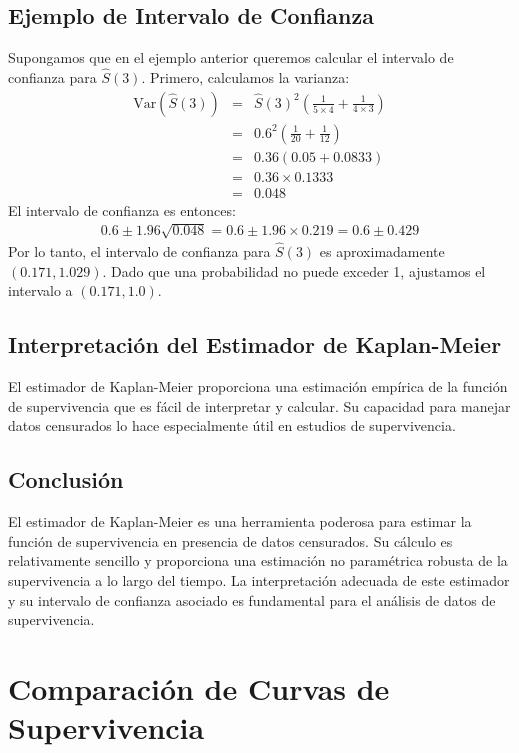 \documentclass[a4paper]{report} %
\begin{document}
\section{Ejemplo de Intervalo de Confianza}
Supongamos que en el ejemplo anterior queremos calcular el intervalo de confianza para $\hat{S}(3)$. Primero, calculamos la varianza:
\begin{eqnarray*}
\text{Var}(\hat{S}(3)) &=& \hat{S}(3)^2 \left( \frac{1}{5 \times 4} + \frac{1}{4 \times 3} \right) \\
                       &=& 0.6^2 \left( \frac{1}{20} + \frac{1}{12} \right) \\
                       &=& 0.36 \left( 0.05 + 0.0833 \right) \\
                       &=& 0.36 \times 0.1333 \\
                       &=& 0.048
\end{eqnarray*}
El intervalo de confianza es entonces:
\begin{eqnarray*}
0.6 \pm 1.96 \sqrt{0.048} = 0.6 \pm 1.96 \times 0.219 = 0.6 \pm 0.429
\end{eqnarray*}
Por lo tanto, el intervalo de confianza para $\hat{S}(3)$ es aproximadamente $(0.171, 1.029)$. Dado que una probabilidad no puede exceder 1, ajustamos el intervalo a $(0.171, 1.0)$.

\section{Interpretaci\'on del Estimador de Kaplan-Meier}
El estimador de Kaplan-Meier proporciona una estimaci\'on emp\'irica de la funci\'on de supervivencia que es f\'acil de interpretar y calcular. Su capacidad para manejar datos censurados lo hace especialmente \'util en estudios de supervivencia.

\section{Conclusi\'on}
El estimador de Kaplan-Meier es una herramienta poderosa para estimar la funci\'on de supervivencia en presencia de datos censurados. Su c\'alculo es relativamente sencillo y proporciona una estimaci\'on no param\'etrica robusta de la supervivencia a lo largo del tiempo. La interpretaci\'on adecuada de este estimador y su intervalo de confianza asociado es fundamental para el an\'alisis de datos de supervivencia.



\chapter{Comparación de Curvas de Supervivencia}
\end{document}
